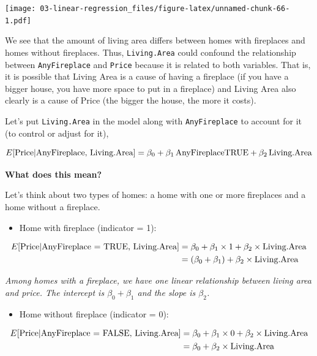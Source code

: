 \documentclass[
]{book}
\providecommand{\tightlist}{%
  \setlength{\itemsep}{0pt}\setlength{\parskip}{0pt}}
\begin{document}
\texttt{[image: 03-linear-regression\_files/figure-latex/unnamed-chunk-66-1.pdf]}

We see that the amount of living area differs between homes with fireplaces and homes without fireplaces. Thus, \texttt{Living.Area} could confound the relationship between \texttt{AnyFireplace} and \texttt{Price} because it is related to both variables. That is, it is possible that Living Area is a cause of having a fireplace (if you have a bigger house, you have more space to put in a fireplace) and Living Area also clearly is a cause of Price (the bigger the house, the more it costs).

Let's put \texttt{Living.Area} in the model along with \texttt{AnyFireplace} to account for it (to control or adjust for it),

\[E[\hbox{Price} | \hbox{AnyFireplace, Living.Area}] = \beta_0 + \beta_1\,\hbox{AnyFireplaceTRUE} + \beta_2\,\hbox{Living.Area}\]

\textbf{What does this mean?}

Let's think about two types of homes: a home with one or more fireplaces and a home without a fireplace.

\begin{itemize}
\tightlist
\item
  Home with fireplace (indicator = 1):
\end{itemize}

\begin{align*}
E[\hbox{Price}| \hbox{AnyFireplace = TRUE, Living.Area}] &= \beta_0 + \beta_1 \times 1 + \beta_2 \times \hbox{Living.Area} \\
&= (\beta_0 + \beta_1 ) + \beta_2 \times \hbox{Living.Area}
\end{align*}

\emph{Among homes with a fireplace, we have one linear relationship between living area and price. The intercept is \(\beta_0+\beta_1\) and the slope is \(\beta_2\).}

\begin{itemize}
\tightlist
\item
  Home without fireplace (indicator = 0):
\end{itemize}

\begin{align*}
E[\hbox{Price}| \hbox{AnyFireplace = FALSE, Living.Area}] &= \beta_0 + \beta_1 \times 0 + \beta_2 \times \hbox{Living.Area} \\
&= \beta_0 + \beta_2 \times \hbox{Living.Area}
\end{align*}
\end{document}
